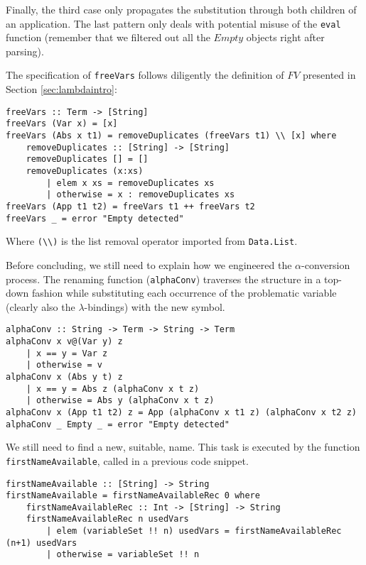 \documentclass{article}
\begin{document}
Finally, the third case only propagates the substitution through both children of an application. The last pattern only deals with potential misuse of the \lstinline|eval| function (remember that we filtered out all the $Empty$ objects right after parsing).

The specification of \lstinline|freeVars| follows diligently the definition of $FV$ presented in Section \ref{sec:lambdaintro}:

\begin{lstlisting}
freeVars :: Term -> [String]
freeVars (Var x) = [x]
freeVars (Abs x t1) = removeDuplicates (freeVars t1) \\ [x] where
    removeDuplicates :: [String] -> [String]
    removeDuplicates [] = []
    removeDuplicates (x:xs)
        | elem x xs = removeDuplicates xs
        | otherwise = x : removeDuplicates xs
freeVars (App t1 t2) = freeVars t1 ++ freeVars t2
freeVars _ = error "Empty detected"
\end{lstlisting}

Where \lstinline|(\\)| is the list removal operator imported from \lstinline|Data.List|.

Before concluding, we still need to explain how we engineered the $\alpha$-conversion process. The renaming function (\lstinline|alphaConv|) traverses the structure in a top-down fashion while substituting each occurrence of the problematic variable (clearly also the $\lambda$-bindings) with the new symbol.

\begin{lstlisting}
alphaConv :: String -> Term -> String -> Term
alphaConv x v@(Var y) z
    | x == y = Var z
    | otherwise = v
alphaConv x (Abs y t) z
    | x == y = Abs z (alphaConv x t z)
    | otherwise = Abs y (alphaConv x t z)
alphaConv x (App t1 t2) z = App (alphaConv x t1 z) (alphaConv x t2 z)
alphaConv _ Empty _ = error "Empty detected"
\end{lstlisting}

We still need to find a new, suitable, name. This task is executed by the function \lstinline|firstNameAvailable|, called in a previous code snippet.

\begin{lstlisting}
firstNameAvailable :: [String] -> String
firstNameAvailable = firstNameAvailableRec 0 where
    firstNameAvailableRec :: Int -> [String] -> String
    firstNameAvailableRec n usedVars
        | elem (variableSet !! n) usedVars = firstNameAvailableRec (n+1) usedVars
        | otherwise = variableSet !! n
\end{lstlisting}
\end{document}
